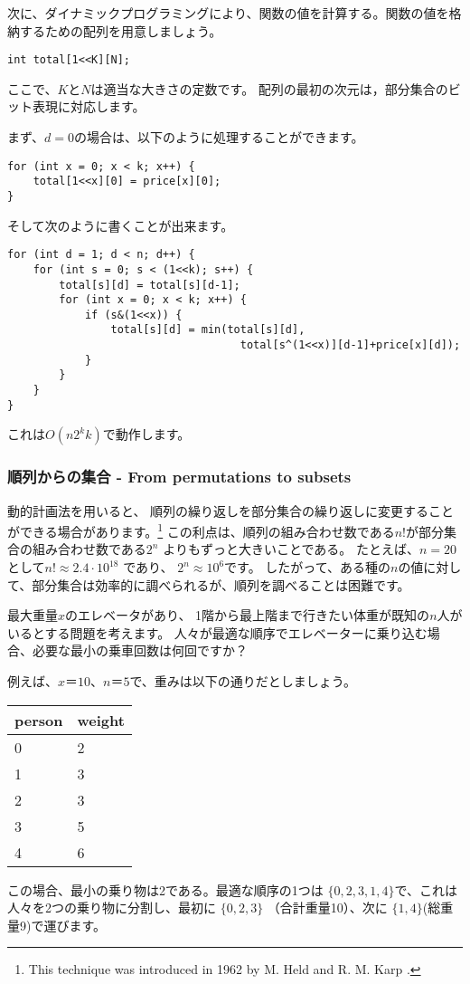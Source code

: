次に、ダイナミックプログラミングにより、関数の値を計算する。関数の値を格納するための配列を用意しましょう。
\begin{lstlisting}
int total[1<<K][N];
\end{lstlisting}
ここで、$K$と$N$は適当な大きさの定数です。
配列の最初の次元は，部分集合のビット表現に対応します。

まず、$d=0$の場合は、以下のように処理することができます。
\begin{lstlisting}
for (int x = 0; x < k; x++) {
    total[1<<x][0] = price[x][0];
}
\end{lstlisting}
そして次のように書くことが出来ます。
\begin{lstlisting}
for (int d = 1; d < n; d++) {
    for (int s = 0; s < (1<<k); s++) {
        total[s][d] = total[s][d-1];
        for (int x = 0; x < k; x++) {
            if (s&(1<<x)) {
                total[s][d] = min(total[s][d],
                                    total[s^(1<<x)][d-1]+price[x][d]);
            }
        }
    }
}
\end{lstlisting}
これは$O(n 2^k k)$で動作します。

\subsubsection{順列からの集合 - From permutations to subsets}

動的計画法を用いると、
順列の繰り返しを部分集合の繰り返しに変更することができる場合があります。\footnote{This technique was introduced in 1962
by M. Held and R. M. Karp \cite{hel62}.}
この利点は、順列の組み合わせ数である$n!$が部分集合の組み合わせ数である$2^n$ よりもずっと大きいことである。
たとえば、$n = 20$として$n! \approx 2.4 \cdot 10^{18}$ であり、 $2^n \approx 10^6$です。
したがって、ある種の$n$の値に対して、部分集合は効率的に調べられるが、順列を調べることは困難です。

最大重量$x$のエレベータがあり、
1階から最上階まで行きたい体重が既知の$n$人がいるとする問題を考えます。
人々が最適な順序でエレベーターに乗り込む場合、必要な最小の乗車回数は何回ですか？

例えば、$x＝10$、$n＝5$で、重みは以下の通りだとしましょう。
\begin{center}
\begin{tabular}{ll}
person & weight \\
\hline
0 & 2 \\
1 & 3 \\
2 & 3 \\
3 & 5 \\
4 & 6 \\
\end{tabular}
\end{center}
この場合、最小の乗り物は2である。最適な順序の1つは
$\{0,2,3,1,4\}$で、これは人々を2つの乗り物に分割し、最初に
$\{0,2,3\}$ （合計重量10）、次に
$\{1,4\}$(総重量9)で運びます。

